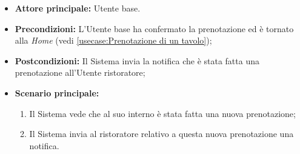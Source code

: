 \label{usecase:Notifica prenotazione}
\begin{itemize}
	\item \textbf{Attore principale:} Utente base.
	
	\item \textbf{Precondizioni:} L'Utente base ha confermato la prenotazione ed è tornato alla \textit{Home} (vedi \autoref{usecase:Prenotazione di un tavolo});

    
	\item \textbf{Postcondizioni:} Il Sistema invia la notifica che è stata fatta una prenotazione all'Utente ristoratore;
     
	\item \textbf{Scenario principale:}
	      \begin{enumerate}
                \item Il Sistema vede che al suo interno è stata fatta una nuova prenotazione;
                \item Il Sistema invia al ristoratore relativo a questa nuova prenotazione una notifica.
	      \end{enumerate}
\end{itemize}